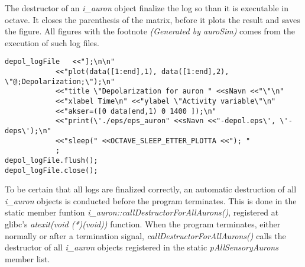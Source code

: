 			The destructor of an \emph{i\_auron} object finalize the log so than it is executable in octave.
			It closes the parenthesis of the matrix, before it plots the result and saves the figure.
			All figures with the footnote \emph{(Generated by \emph{auroSim})} comes from the execution of such log files.
\begin{lstlisting}
depol_logFile 	<<"];\n\n"
			<<"plot(data([1:end],1), data([1:end],2), \"@;Depolarization;\");\n"
			<<"title \"Depolarization for auron " <<sNavn <<"\"\n"
			<<"xlabel Time\n" <<"ylabel \"Activity variable\"\n"
			<<"akser=([0 data(end,1) 0 1400 ]);\n"
			<<"print(\'./eps/eps_auron" <<sNavn <<"-depol.eps\', \'-deps\');\n"
			<<"sleep(" <<OCTAVE_SLEEP_ETTER_PLOTTA <<"); "
			;
depol_logFile.flush();
depol_logFile.close();
\end{lstlisting}
			
			To be certain that all logs are finalized correctly, an automatic destruction of all \emph{i\_auron} objects is conducted before the program terminates.
			This is done in the static member funtion \emph{i\_auron::callDestructorForAllAurons()}, registered at glibc's \emph{atexit(void (*)(void))} function.
			When the program terminates, either normally or after a termination signal, \emph{callDestructorForAllAurons()} calls the destructor of all \emph{i\_auron} objects registered in the static \emph{pAllSensoryAurons} member list.

